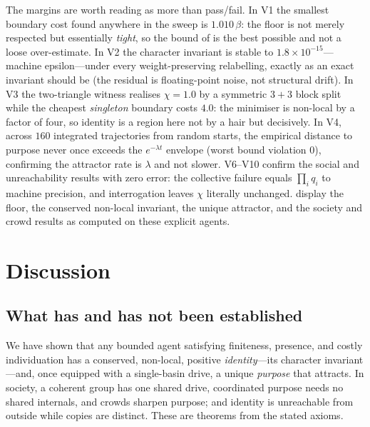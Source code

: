 \documentclass[11pt,twocolumn,a4paper]{article}
\newcommand{\floorc}{\beta}          %
\newcommand{\Char}{\chi}             %
\begin{document}
The margins are worth reading as more than pass/fail. In V1 the smallest
boundary cost found anywhere in the sweep is $1.010\,\floorc$: the floor is
not merely respected but essentially \emph{tight}, so the bound of
 is the best possible and not a loose over-estimate. In V2
the character invariant is stable to $1.8\times10^{-15}$---machine
epsilon---under every weight-preserving relabelling, exactly as an exact
invariant should be (the residual is floating-point noise, not structural
drift). In V3 the two-triangle witness realises $\Char=1.0$ by a
symmetric $3{+}3$ block split while the cheapest \emph{singleton} boundary
costs $4.0$: the minimiser is non-local by a factor of four, so identity is
a region here not by a hair but decisively. In V4, across $160$ integrated
trajectories from random starts, the empirical distance to purpose never
once exceeds the $e^{-\lambda t}$ envelope (worst bound violation $0$),
confirming the attractor rate is $\lambda$ and not slower. V6--V10 confirm
the social and unreachability results with zero error: the collective
failure equals $\prod_i q_i$ to machine precision, and interrogation leaves
$\Char$ literally unchanged.  display the
floor, the conserved non-local invariant, the unique attractor, and the
society and crowd results as computed on these explicit agents.



\section{Discussion}
\label{sec:discussion}

\subsection{What has and has not been established}

We have shown that any bounded agent satisfying finiteness, presence, and
costly individuation has a conserved, non-local, positive
\emph{identity}---its character invariant---and, once equipped with a
single-basin drive, a unique \emph{purpose} that attracts. In society, a
coherent group has one shared drive, coordinated purpose needs no shared
internals, and crowds sharpen purpose; and identity is unreachable from
outside while copies are distinct. These are theorems from the stated
axioms.
\end{document}
